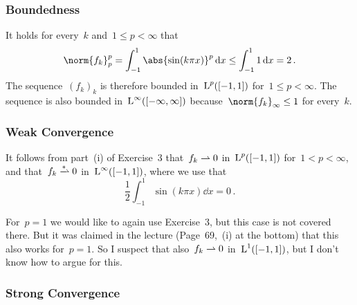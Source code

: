 \section{}





\subsection{}



\subsubsection{Boundedness}

It holds for every~$k$ and~$1 \leq p < \infty$ that
\[
        \norm{f_k}_p^p
  =     \int_{-1}^1 \abs{\sin(k \pi x)}^p \dd{x}
  \leq  \int_{-1}^1 1 \dd{x}
  =     2 \,.
\]
The sequence~$(f_k)_k$ is therefore bounded in~$\operatorname{L}^p([-1,1])$ for~$1 \leq p < \infty$.
The sequence is also bounded in~$\operatorname{L}^\infty([-\infty,\infty])$ because~$\norm{f_k}_\infty \leq 1$ for every~$k$.



\subsubsection{Weak Convergence}

It follows from part~(i) of Exercise~3 that~$f_k \rightharpoonup 0$ in~$\operatorname{L}^p([-1,1])$ for~$1 < p < \infty$, and that~$f_k \wtostar 0$ in~$\operatorname{L}^\infty([-1,1])$, where we use that
\[
    \frac{1}{2} \int_{-1}^1 \sin(k \pi x) \dd{x}
  = 0 \,.
\]

For~$p = 1$ we would like to again use Exercise~3, but this case is not covered there.
But it was claimed in the lecture (Page~69,~(i) at the bottom) that this also works for~$p = 1$.
So I suspect that also~$f_k \rightharpoonup 0$ in~$\operatorname{L}^1([-1,1])$, but I don’t know how to argue for this.



\subsubsection{Strong Convergence}

